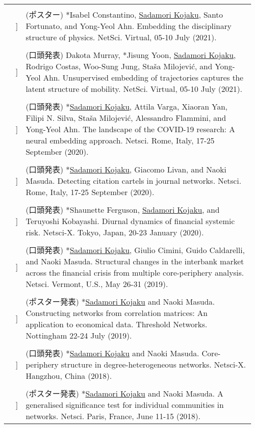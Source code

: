 \documentclass[letterpaper, 11pt]{article}
\newcounter{papercount}
\newcounter{papertype}
\newcommand{\paperitem}{%
\stepcounter{papercount}%
{\color{OliveGreen}{[\arabic{papertype}.\thepapercount}]}
}
\begin{document}
\begin{longtable}{p{0in}p{2em}p{5.5in}}
    & & \\
    &\paperitem & (ポスター) *Isabel Constantino, \underline{Sadamori Kojaku}, Santo Fortunato, and Yong-Yeol Ahn.
    Embedding the disciplinary structure of physics. NetSci. Virtual, 05-10 July (2021).\\
    & & \\
    &\paperitem &  (口頭発表) Dakota Murray, *Jisung Yoon, \underline{Sadamori Kojaku}, Rodrigo Costas, Woo-Sung Jung, Sta\v{s}a Milojevi\'{c}, and Yong-Yeol Ahn.
    Unsupervised embedding of trajectories captures the latent structure of mobility.  NetSci. Virtual, 05-10 July (2021).\\
    & & \\
    &\paperitem & (口頭発表) *\underline{Sadamori Kojaku}, Attila Varga, Xiaoran Yan, Filipi N. Silva, Staša Milojević, Alessandro Flammini, and Yong-Yeol Ahn. The landscape of the COVID-19 research: A neural embedding approach. Netsci. Rome, Italy, 17-25 September (2020).\\
    & & \\
    &\paperitem & (口頭発表) *\underline{Sadamori Kojaku}, Giacomo Livan, and Naoki Masuda. Detecting citation cartels in journal networks. Netsci. Rome, Italy, 17-25 September (2020).\\
    & & \\
    &\paperitem & (口頭発表) *Shaunette Ferguson, \underline{Sadamori Kojaku}, and Teruyoshi Kobayashi. Diurnal dynamics of financial systemic risk. Netsci-X. Tokyo, Japan, 20-23 January (2020).\\
    & & \\
    &\paperitem & (口頭発表) *\underline{Sadamori Kojaku}, Giulio Cimini, Guido Caldarelli, and Naoki Masuda. Structural changes in the interbank market across the financial crisis from multiple core-periphery analysis. Netsci. Vermont, U.S., May 26-31 (2019).\\
    & & \\
    &\paperitem &  (ポスター発表) *\underline{Sadamori Kojaku} and Naoki Masuda. Constructing networks from correlation matrices: An application to economical data. Threshold Networks. Nottingham 22-24 July (2019).\\
    & & \\
    &\paperitem & (口頭発表) *\underline{Sadamori Kojaku} and Naoki Masuda. Core-periphery structure in degree-heterogeneous networks. Netsci-X. Hangzhou, China (2018).\\
    & & \\
    &\paperitem &  (ポスター発表) *\underline{Sadamori Kojaku} and Naoki Masuda. A generalised significance test for individual communities in networks. Netsci. Paris, France, June 11-15 (2018).\\

\end{longtable}
\end{document}
